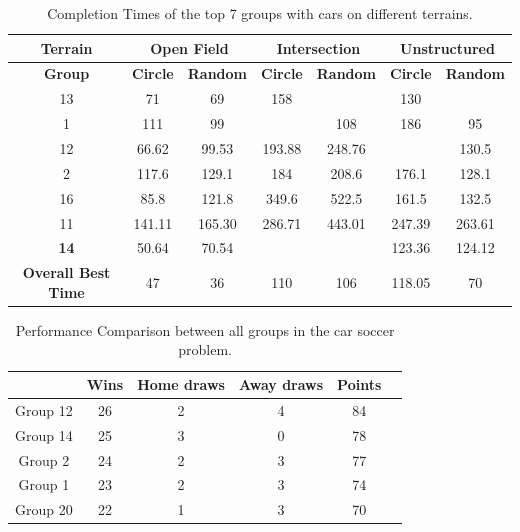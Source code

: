 \documentclass[a4paper,12pt]{article}
\begin{document}
\begin{table}[!hptb]
  \centering
  \begin{tabular}{|c|c|c|c|c|c|c|}
    \hline
    \textbf{Terrain} & \multicolumn{2}{|c|}{\textbf{Open Field}} & \multicolumn{2}{|c|}{\textbf{Intersection}} & \multicolumn{2}{|c|}{\textbf{Unstructured}} \\
    \hline
    \textbf{Group} & \textbf{Circle} & \textbf{Random} & \textbf{Circle} & \textbf{Random} & \textbf{Circle} & \textbf{Random} \\
    \hline
    13 & 71 & 69 & 158 & \color{blue}{106} & 130 & \color{blue}{70} \\
    \hline
    1 & 111 & 99 & \color{blue}{110} & 108 & 186 & 95 \\
    \hline
    12 & 66.62 & 99.53 & 193.88 & 248.76 & \color{blue}{118.05} & 130.5 \\
    \hline
    2 & 117.6 & 129.1 & 184 & 208.6 & 176.1 & 128.1 \\
    \hline
    16 & 85.8 & 121.8 & 349.6 & 522.5 & 161.5 & 132.5 \\
    \hline
    11 & 141.11 & 165.30 & 286.71 & 443.01 & 247.39 & 263.61 \\
    \hline
    \textbf{14} & 50.64 & 70.54 & \color{red}{NA} & \color{red}{NA} & 123.36 & 124.12 \\
    \hline
    \textbf{Overall Best Time} & 47 & 36 &	110 &	106 &	118.05 &	70 \\
    \hline
  \end{tabular}
  \caption{Completion Times of the top 7 groups with cars on different terrains.}
  \label{tab:results_car_CA}
\end{table}



\begin{table}[!hptb]
  \begin{center}
  \begin{tabular}{|c|c|c|c|c|c|}
  \hline
   & Wins & Home draws  & Away draws & Points  \\ \hline
  Group 12 & 26	& 2	& 4	& 84  \\ \hline
  Group 14  & 25	& 3 	& 0 	& 78	 \\ \hline
  Group 2  & 24 &	2	& 3	& 77 \\ \hline
  Group 1  & 23	& 2 	& 3	& 74	 \\ \hline
  Group 20  & 22 &	1	& 3	& 70 \\ \hline
  \end{tabular}
  \caption{Performance Comparison between all groups in the car soccer problem.}
  \label{tab:compare_results_soccer_car}
  \end{center}
\end{table}
\end{document}
